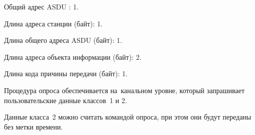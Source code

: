 \begin{list}{--}{Фиксированные параметры пакета МЭК~870-5-101:} 
	\item Общий адрес ASDU : 1.
	\item Длина адреса станции (байт): 1.
	\item Длина общего адреса ASDU (байт): 1.
	\item Длина адреса объекта информации (байт): 2.
	\item Длина кода причины передачи (байт): 1.
\end{list}

Процедура опроса обеспечивается на~канальном уровне, который запрашивает пользовательские данные классов~1 и 2. 

Данные класса~2 можно считать командой опроса, при этом они будут переданы без метки времени.